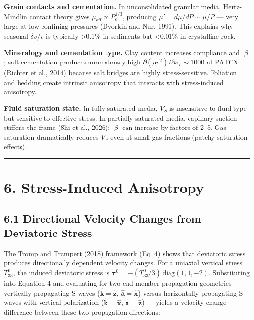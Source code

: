 \documentclass[12pt]{article}
\begin{document}
\textbf{Grain contacts and cementation.} In unconsolidated granular
media, Hertz-Mindlin contact theory gives
\(\mu_{\text{eff}} \propto P_e^{1/3}\), producing
\(\mu' = d\mu/dP \sim \mu/P\) --- very large at low confining pressures
(Dvorkin and Nur, 1996). This explains why seasonal \(\delta v/v\) is
typically \textgreater{}0.1\% in sediments but \textless{}0.01\% in
crystalline rock.

\textbf{Mineralogy and cementation type.} Clay content increases
compliance and \(|\beta|\); salt cementation produces anomalously high
\(\partial(\rho v^2)/\partial\sigma_c \sim 1000\) at PATCX (Richter et
al., 2014) because salt bridges are highly stress-sensitive. Foliation
and bedding create intrinsic anisotropy that interacts with
stress-induced anisotropy.

\textbf{Fluid saturation state.} In fully saturated media, \(V_S\) is
insensitive to fluid type but sensitive to effective stress. In
partially saturated media, capillary suction stiffens the frame (Shi et
al., 2026); \(|\beta|\) can increase by factors of 2--5. Gas saturation
dramatically reduces \(V_P\) even at small gas fractions (patchy
saturation effects).

\begin{center}\rule{0.5\linewidth}{0.5pt}\end{center}

\section{6. Stress-Induced Anisotropy}\label{stress-induced-anisotropy}

\subsection{6.1 Directional Velocity Changes from Deviatoric
Stress}\label{directional-velocity-changes-from-deviatoric-stress}

The Tromp and Trampert (2018) framework (Eq. 4) shows that deviatoric
stress produces directionally dependent velocity changes. For a uniaxial
vertical stress \(T_{33}^0\), the induced deviatoric stress is
\(\boldsymbol{\tau}^0 = -(T_{33}^0/3)\,\text{diag}(1,1,-2)\).
Substituting into Equation 4 and evaluating for two end-member
propagation geometries --- vertically propagating S-waves
(\(\hat{\mathbf{k}} = \hat{\mathbf{z}}\),
\(\hat{\mathbf{a}} = \hat{\mathbf{x}}\)) versus horizontally propagating
S-waves with vertical polarization
(\(\hat{\mathbf{k}} = \hat{\mathbf{x}}\),
\(\hat{\mathbf{a}} = \hat{\mathbf{z}}\)) --- yields a velocity-change
difference between these two propagation directions:
\end{document}
